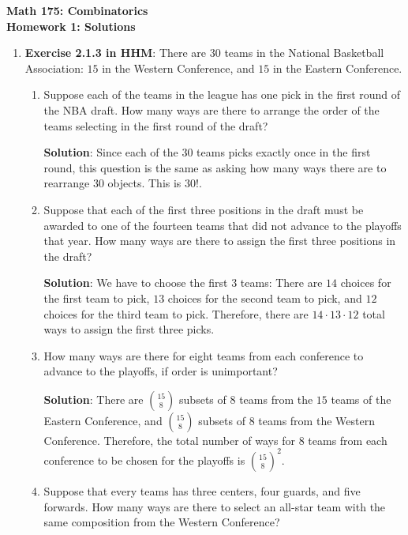 \documentclass[11pt]{article}
\begin{document}
\begin{center}
{\Large \bf Math 175: Combinatorics} \\
{\Large \bf Homework 1: Solutions}\\
\end{center}

\vspace{5mm}

\begin{enumerate}

\item \textbf{Exercise 2.1.3 in HHM}: There are $30$ teams in the National Basketball Association: $15$ in the Western Conference, and $15$ in the Eastern Conference.
\begin{enumerate}

\item Suppose each of the teams in the league has one pick in the first round of the NBA draft.  How many ways are there to arrange the order of the teams selecting in the first round of the draft?

{\bf Solution}: Since each of the $30$ teams picks exactly once in the first round, this question is the same as asking how many ways there are to rearrange $30$ objects.  This is $30!$.

\item Suppose that each of the first three positions in the draft must be awarded to one of the fourteen teams that did not advance to the playoffs that year.  How many ways are there to assign the first three positions in the draft?

{\bf Solution}: We have to choose the first $3$ teams: There are $14$ choices for the first team to pick, $13$ choices for the second team to pick, and $12$ choices for the third team to pick.  Therefore, there are $14\cdot 13\cdot12$ total ways to assign the first three picks.

\item How many ways are there for eight teams from each conference to advance to the playoffs, if order is unimportant?

{\bf Solution}: There are $\binom{15}{8}$ subsets of $8$ teams from the $15$ teams of the Eastern Conference, and $\binom{15}{8}$ subsets of $8$ teams from the Western Conference.  Therefore, the total number of ways for $8$ teams from each conference to be chosen for the playoffs is $\binom{15}{8}^2$.
 
\item Suppose that every teams has three centers, four guards, and five forwards.  How many ways are there to select an all-star team with the same composition from the Western Conference?


\end{enumerate}
\end{enumerate}
\end{document}
